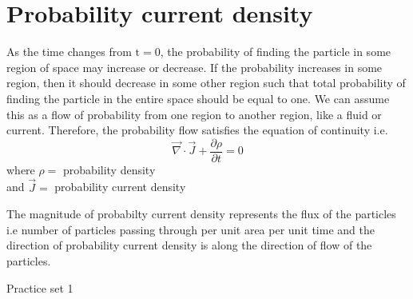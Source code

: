 \section{Probability current density}
As the time changes from $\mathrm{t}=0$, the probability of finding the particle in some region of space may increase or decrease. If the probability increases in some region, then it should decrease in some other region such that total probability of finding the particle in the entire space should be equal to one. We can assume this as a flow of probability from one region to another region, like a fluid or current. Therefore, the probability flow satisfies the equation of continuity i.e.
$$
\vec{\nabla} \cdot \vec{J}+\frac{\partial \rho}{\partial t}=0
$$
where $\rho=$ probability density \\
and $\vec{J}=$ probability current density
 \begin{center}
 \end{center}
The magnitude of probabilty current density represents the flux of the particles i.e number of particles passing through per unit area per unit time and the direction of probability current density is along the direction of flow of the particles.\\
\newpage
\begin{abox}
	Practice set 1
	\end{abox}
